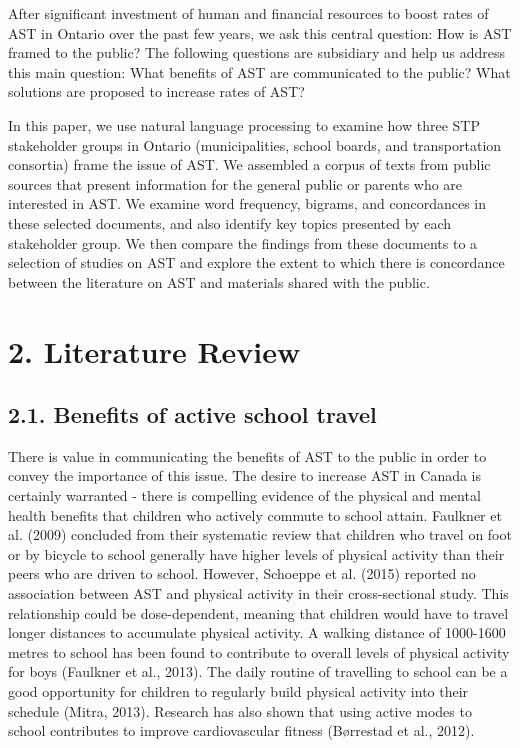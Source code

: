 \documentclass[]{elsarticle} %
\begin{document}
After significant investment of human and financial resources to boost
rates of AST in Ontario over the past few years, we ask this central
question: How is AST framed to the public? The following questions are
subsidiary and help us address this main question: What benefits of AST
are communicated to the public? What solutions are proposed to increase
rates of AST?

In this paper, we use natural language processing to examine how three
STP stakeholder groups in Ontario (municipalities, school boards, and
transportation consortia) frame the issue of AST. We assembled a corpus
of texts from public sources that present information for the general
public or parents who are interested in AST. We examine word frequency,
bigrams, and concordances in these selected documents, and also identify
key topics presented by each stakeholder group. We then compare the
findings from these documents to a selection of studies on AST and
explore the extent to which there is concordance between the literature
on AST and materials shared with the public.

\hypertarget{literature-review}{%
\section{2. Literature Review}\label{literature-review}}

\hypertarget{benefits-of-active-school-travel}{%
\subsection{2.1. Benefits of active school
travel}\label{benefits-of-active-school-travel}}

There is value in communicating the benefits of AST to the public in
order to convey the importance of this issue. The desire to increase AST
in Canada is certainly warranted - there is compelling evidence of the
physical and mental health benefits that children who actively commute
to school attain. Faulkner et al. (2009) concluded from their systematic
review that children who travel on foot or by bicycle to school
generally have higher levels of physical activity than their peers who
are driven to school. However, Schoeppe et al. (2015) reported no
association between AST and physical activity in their cross-sectional
study. This relationship could be dose-dependent, meaning that children
would have to travel longer distances to accumulate physical activity. A
walking distance of 1000-1600 metres to school has been found to
contribute to overall levels of physical activity for boys (Faulkner et
al., 2013). The daily routine of travelling to school can be a good
opportunity for children to regularly build physical activity into their
schedule (Mitra, 2013). Research has also shown that using active modes
to school contributes to improve cardiovascular fitness (Børrestad et
al., 2012).
\end{document}
